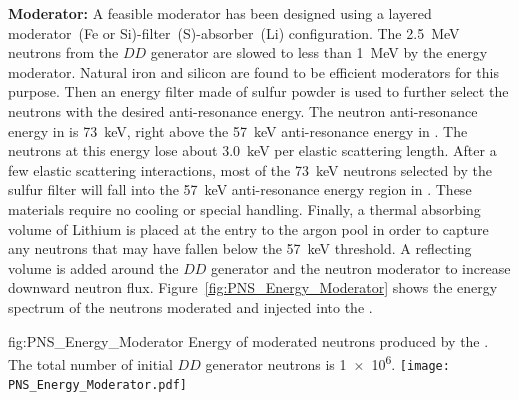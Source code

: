{\bf Moderator:}  A feasible moderator has been designed using a layered moderator~(Fe or Si)-filter~(S)-absorber~(Li) %
configuration. The \SI{2.5}{\MeV} neutrons from the $DD$ generator are slowed to less than \SI{1}{\MeV} by the energy moderator. Natural iron and silicon are found to be efficient moderators for this purpose. Then an energy filter made of sulfur powder is used to further select the neutrons with the desired anti-resonance energy.
The neutron anti-resonance energy in  is \SI{73}{\keV}, right above the \SI{57}{\keV} anti-resonance energy in . The neutrons at this energy lose about \SI{3.0}{\keV} per elastic scattering length. After a few elastic scattering interactions, most of the \SI{73}{\keV} neutrons selected by the sulfur filter will fall into the \SI{57}{\keV} anti-resonance energy region in . These materials require no cooling or special handling. Finally, a thermal absorbing volume of Lithium is placed at the entry to the argon pool in order to capture any neutrons that may have fallen below the \SI{57}{\keV} threshold. A reflecting volume is added around the $DD$ generator and the neutron moderator to increase downward neutron flux. Figure~\ref{fig:PNS_Energy_Moderator} shows the energy spectrum of the neutrons moderated and injected into the .

\begin{dunefigure}{fig:PNS_Energy_Moderator}
{Energy of moderated neutrons produced by the . %
The total number of initial $DD$ generator neutrons is \num{1e6}.}
\texttt{[image: PNS\_Energy\_Moderator.pdf]}
\end{dunefigure}

